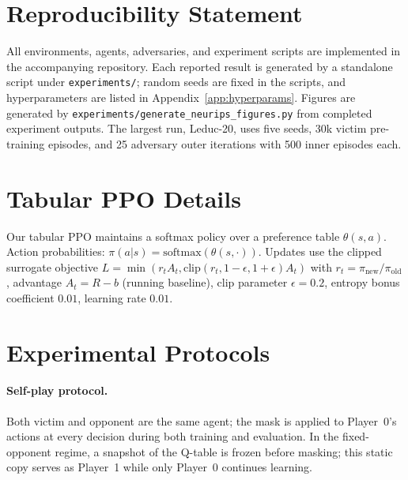 \documentclass{article}
\begin{document}
\section*{Reproducibility Statement}

All environments, agents, adversaries, and experiment scripts are implemented in the accompanying repository. Each reported result is generated by a standalone script under \texttt{experiments/}; random seeds are fixed in the scripts, and hyperparameters are listed in Appendix~\ref{app:hyperparams}. Figures are generated by \texttt{experiments/generate\_neurips\_figures.py} from completed experiment outputs. The largest run, Leduc-20, uses five seeds, 30k victim pre-training episodes, and 25 adversary outer iterations with 500 inner episodes each.




\appendix

\section{Tabular PPO Details}
\label{app:ppo}
Our tabular PPO maintains a softmax policy over a preference table $\theta(s,a)$. Action probabilities: $\pi(a|s) = \text{softmax}(\theta(s,\cdot))$. Updates use the clipped surrogate objective $L = \min(r_t A_t, \text{clip}(r_t, 1{-}\epsilon, 1{+}\epsilon) A_t)$ with $r_t = \pi_{\text{new}}/\pi_{\text{old}}$, advantage $A_t = R - b$ (running baseline), clip parameter $\epsilon = 0.2$, entropy bonus coefficient $0.01$, learning rate $0.01$.

\section{Experimental Protocols}
\label{app:protocols}

\paragraph{Self-play protocol.}
Both victim and opponent are the same agent; the mask is applied to Player~0's actions at every decision during both training and evaluation. In the fixed-opponent regime, a snapshot of the Q-table is frozen before masking; this static copy serves as Player~1 while only Player~0 continues learning.
\end{document}
